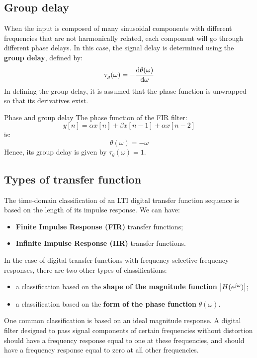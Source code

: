 \documentclass[../../main/main.tex]{subfiles}
\begin{document}
\subsection{Group delay}
When the input is composed of many sinusoidal components with different frequencies that are not harmonically related, each component will go through different phase delays. In this case, the signal delay is determined using the \textbf{group delay}, defined by:
\begin{equation}
    \tau_{g}(\omega)
    =
    - \dv{\theta(\omega)}{\omega}
    \label{eq:L17_S21_1}
\end{equation}
In defining the group delay, it is assumed that the phase function is unwrapped so that its derivatives exist.

\begin{example}{Phase and group delay}{}
    The phase function of the FIR filter:
    \begin{equation}
        y[n]
        =
        \alpha x[n] + \beta x[n-1] + \alpha x[n-2]
        \label{eq:L17_S22_1}
    \end{equation}
    is:
    \begin{equation}
        \theta(\omega)
        =
        - \omega
        \label{eq:L17_S22_2}
    \end{equation}
    Hence, its group delay is given by \( \tau_{g}(\omega) = 1 \).
\end{example}



\subsection{Types of transfer function}
The time-domain classification of an LTI digital transfer function sequence is based on the length of its impulse response. We can have:
\begin{itemize}
    \item \textbf{Finite Impulse Response (FIR)} transfer functions;
    \item \textbf{Infinite Impulse Response (IIR)} transfer functions.
\end{itemize}
In the case of digital transfer functions with frequency-selective frequency responses, there are two other types of classifications:
\begin{itemize}
    \item a classification based on the \textbf{shape of the magnitude function} \( \abs{H(e^{j\omega})} \);
    \item a classification based on the \textbf{form of the phase function} \( \theta(\omega) \).
\end{itemize}
One common classification is based on an ideal magnitude response. A digital filter designed to pass signal components of certain frequencies without distortion should have a frequency response equal to one at these frequencies, and should have a frequency response equal to zero at all other frequencies.
\end{document}
